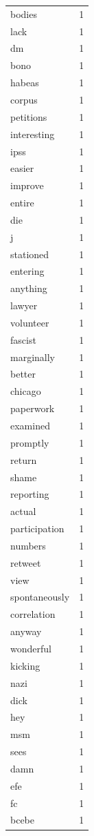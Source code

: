 \begin{tabular}{lr}
bodies & 1 \\
lack & 1 \\
dm & 1 \\
bono & 1 \\
habeas & 1 \\
corpus & 1 \\
petitions & 1 \\
interesting & 1 \\
ipss & 1 \\
easier & 1 \\
improve & 1 \\
entire & 1 \\
die & 1 \\
j & 1 \\
stationed & 1 \\
entering & 1 \\
anything & 1 \\
lawyer & 1 \\
volunteer & 1 \\
fascist & 1 \\
marginally & 1 \\
better & 1 \\
chicago & 1 \\
paperwork & 1 \\
examined & 1 \\
promptly & 1 \\
return & 1 \\
shame & 1 \\
reporting & 1 \\
actual & 1 \\
participation & 1 \\
numbers & 1 \\
retweet & 1 \\
view & 1 \\
spontaneously & 1 \\
correlation & 1 \\
anyway & 1 \\
wonderful & 1 \\
kicking & 1 \\
nazi & 1 \\
dick & 1 \\
hey & 1 \\
msm & 1 \\
sees & 1 \\
damn & 1 \\
efe & 1 \\
fc & 1 \\
bcebe & 1 \\

\end{tabular}
